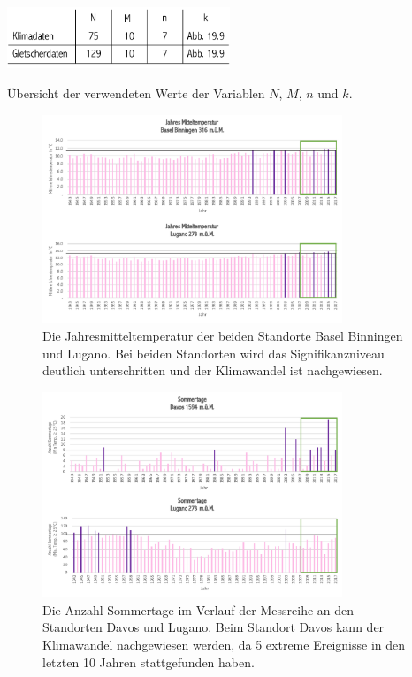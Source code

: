\begin{refsection}
\begin{table}
\centering
\includegraphics[width=0.5\textwidth]{extrem/Tabuebersicht.pdf}
\caption{Übersicht der verwendeten Werte der Variablen $N$, $M$, $n$ und $k$.}
\label{Tabuebersicht}
\end{table}


\begin{figure}
\centering
\includegraphics[width=0.8\textwidth]{extrem/JahresMittel.pdf}
\caption{Die Jahresmitteltemperatur der beiden Standorte Basel Binningen und Lugano. Bei beiden Standorten wird das Signifikanzniveau deutlich unterschritten und der Klimawandel ist nachgewiesen.}
\label{JMittel}
\end{figure}


\begin{figure}
\centering
\includegraphics[width=0.8\textwidth]{extrem/Sommertage.pdf}
\caption{Die Anzahl Sommertage im Verlauf der Messreihe an den Standorten Davos und Lugano. Beim Standort Davos kann der Klimawandel nachgewiesen werden, da 5 extreme Ereignisse in den letzten 10 Jahren stattgefunden haben.}
\label{Sommertage}
\end{figure}



\end{refsection}
